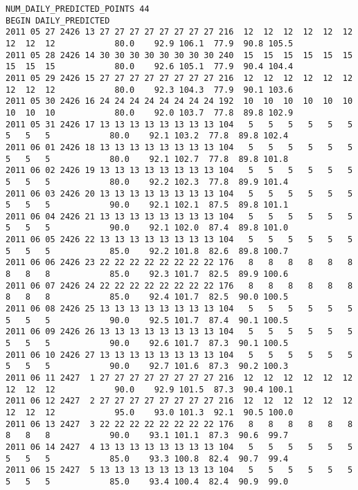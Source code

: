 \begin{landscape}
\begin{small}
\begin{verbatim}
NUM_DAILY_PREDICTED_POINTS 44
BEGIN DAILY_PREDICTED
2011 05 27 2426 13 27 27 27 27 27 27 27 27 216  12  12  12  12  12  12  12  12  12            80.0    92.9 106.1  77.9  90.8 105.5
2011 05 28 2426 14 30 30 30 30 30 30 30 30 240  15  15  15  15  15  15  15  15  15            80.0    92.6 105.1  77.9  90.4 104.4
2011 05 29 2426 15 27 27 27 27 27 27 27 27 216  12  12  12  12  12  12  12  12  12            80.0    92.3 104.3  77.9  90.1 103.6
2011 05 30 2426 16 24 24 24 24 24 24 24 24 192  10  10  10  10  10  10  10  10  10            80.0    92.0 103.7  77.8  89.8 102.9
2011 05 31 2426 17 13 13 13 13 13 13 13 13 104   5   5   5   5   5   5   5   5   5            80.0    92.1 103.2  77.8  89.8 102.4
2011 06 01 2426 18 13 13 13 13 13 13 13 13 104   5   5   5   5   5   5   5   5   5            80.0    92.1 102.7  77.8  89.8 101.8
2011 06 02 2426 19 13 13 13 13 13 13 13 13 104   5   5   5   5   5   5   5   5   5            80.0    92.2 102.3  77.8  89.9 101.4
2011 06 03 2426 20 13 13 13 13 13 13 13 13 104   5   5   5   5   5   5   5   5   5            90.0    92.1 102.1  87.5  89.8 101.1
2011 06 04 2426 21 13 13 13 13 13 13 13 13 104   5   5   5   5   5   5   5   5   5            90.0    92.1 102.0  87.4  89.8 101.0
2011 06 05 2426 22 13 13 13 13 13 13 13 13 104   5   5   5   5   5   5   5   5   5            85.0    92.2 101.8  82.6  89.8 100.7
2011 06 06 2426 23 22 22 22 22 22 22 22 22 176   8   8   8   8   8   8   8   8   8            85.0    92.3 101.7  82.5  89.9 100.6
2011 06 07 2426 24 22 22 22 22 22 22 22 22 176   8   8   8   8   8   8   8   8   8            85.0    92.4 101.7  82.5  90.0 100.5
2011 06 08 2426 25 13 13 13 13 13 13 13 13 104   5   5   5   5   5   5   5   5   5            90.0    92.5 101.7  87.4  90.1 100.5
2011 06 09 2426 26 13 13 13 13 13 13 13 13 104   5   5   5   5   5   5   5   5   5            90.0    92.6 101.7  87.3  90.1 100.5
2011 06 10 2426 27 13 13 13 13 13 13 13 13 104   5   5   5   5   5   5   5   5   5            90.0    92.7 101.6  87.3  90.2 100.3
2011 06 11 2427  1 27 27 27 27 27 27 27 27 216  12  12  12  12  12  12  12  12  12            90.0    92.9 101.5  87.3  90.4 100.1
2011 06 12 2427  2 27 27 27 27 27 27 27 27 216  12  12  12  12  12  12  12  12  12            95.0    93.0 101.3  92.1  90.5 100.0
2011 06 13 2427  3 22 22 22 22 22 22 22 22 176   8   8   8   8   8   8   8   8   8            90.0    93.1 101.1  87.3  90.6  99.7
2011 06 14 2427  4 13 13 13 13 13 13 13 13 104   5   5   5   5   5   5   5   5   5            85.0    93.3 100.8  82.4  90.7  99.4
2011 06 15 2427  5 13 13 13 13 13 13 13 13 104   5   5   5   5   5   5   5   5   5            85.0    93.4 100.4  82.4  90.9  99.0

\end{verbatim}
\end{small}
\end{landscape}
